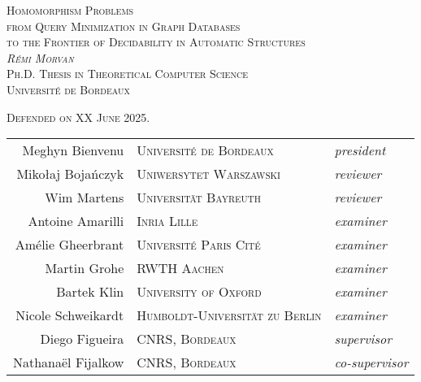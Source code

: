 \begin{titlepage}
\begin{center}
  \Huge\scshape{%
  Homomorphism Problems}\\[.4cm]
  \Large\scshape{%
  from Query Minimization in Graph Databases\\[.2cm]to the Frontier of Decidability in Automatic Structures}\\
  \vspace{6em}
  \normalfont\LARGE{} \emph{Rémi Morvan}\\[1em]
  \Large\scshape
  Ph.D. Thesis in Theoretical Computer Science\\
  \textcolor{maincolor}{Université de Bordeaux}
  \vfill
  \begin{center}
    \normalfont\Large\scshape Defended on XX June 2025.\\[1.5em]
    \normalfont
    \begin{tabular}{rll}
      Meghyn Bienvenu & \textsc{\small Université de Bordeaux} & \emph{president}\\[.5em]
      Mikołaj Bojańczyk & \textsc{\small Uniwersytet Warszawski} & \emph{reviewer}\\
      Wim Martens & \textsc{\small Universität Bayreuth} & \emph{reviewer} \\[.5em]
      Antoine Amarilli & \textsc{\small Inria Lille} & \emph{examiner}\\
      Amélie Gheerbrant & \textsc{\small Université Paris Cité} & \emph{examiner}\\
      Martin Grohe & \textsc{\small RWTH Aachen} & \emph{examiner}\\
      Bartek Klin & \textsc{\small University of Oxford} & \emph{examiner}\\
      Nicole Schweikardt & \textsc{\small Humboldt-Universität zu Berlin} & \emph{examiner}\\[.5em]
      Diego Figueira & \textsc{\small CNRS, Bordeaux} & \emph{supervisor}\\
      Nathanaël Fijalkow & \textsc{\small CNRS, Bordeaux} & \emph{co-supervisor}
    \end{tabular}
  \end{center}
\end{center}
\end{titlepage}
\restoregeometry